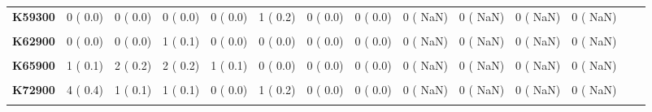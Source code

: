 \documentclass[
]{article}
\begin{document}
\begin{table}[H]
\begin{tabular}[t]{>{\raggedright\arraybackslash}p{5em}ccccccccccccc}
\textbf{K59300} & 0 (  0.0) & 0 (  0.0) & 0 (  0.0) & 0 (  0.0) & 1 (  0.2) & 0 (  0.0) & 0 (  0.0) & 0 (  NaN) & 0 (  NaN) & 0 (  NaN) & 0 (  NaN) &  & \\
\textbf{\cellcolor{gray!10}{K62500}} & \cellcolor{gray!10}{0 (  0.0)} & \cellcolor{gray!10}{1 (  0.1)} & \cellcolor{gray!10}{0 (  0.0)} & \cellcolor{gray!10}{0 (  0.0)} & \cellcolor{gray!10}{0 (  0.0)} & \cellcolor{gray!10}{0 (  0.0)} & \cellcolor{gray!10}{1 (  0.4)} & \cellcolor{gray!10}{0 (  NaN)} & \cellcolor{gray!10}{0 (  NaN)} & \cellcolor{gray!10}{0 (  NaN)} & \cellcolor{gray!10}{0 (  NaN)} & \cellcolor{gray!10}{} & \cellcolor{gray!10}{}\\
\textbf{K62900} & 0 (  0.0) & 0 (  0.0) & 1 (  0.1) & 0 (  0.0) & 0 (  0.0) & 0 (  0.0) & 0 (  0.0) & 0 (  NaN) & 0 (  NaN) & 0 (  NaN) & 0 (  NaN) &  & \\
\textbf{\cellcolor{gray!10}{K63100}} & \cellcolor{gray!10}{0 (  0.0)} & \cellcolor{gray!10}{1 (  0.1)} & \cellcolor{gray!10}{1 (  0.1)} & \cellcolor{gray!10}{3 (  0.4)} & \cellcolor{gray!10}{0 (  0.0)} & \cellcolor{gray!10}{0 (  0.0)} & \cellcolor{gray!10}{0 (  0.0)} & \cellcolor{gray!10}{0 (  NaN)} & \cellcolor{gray!10}{0 (  NaN)} & \cellcolor{gray!10}{0 (  NaN)} & \cellcolor{gray!10}{0 (  NaN)} & \cellcolor{gray!10}{} & \cellcolor{gray!10}{}\\
\textbf{K65900} & 1 (  0.1) & 2 (  0.2) & 2 (  0.2) & 1 (  0.1) & 0 (  0.0) & 0 (  0.0) & 0 (  0.0) & 0 (  NaN) & 0 (  NaN) & 0 (  NaN) & 0 (  NaN) &  & \\
\textbf{\cellcolor{gray!10}{K72000}} & \cellcolor{gray!10}{1 (  0.1)} & \cellcolor{gray!10}{0 (  0.0)} & \cellcolor{gray!10}{0 (  0.0)} & \cellcolor{gray!10}{0 (  0.0)} & \cellcolor{gray!10}{0 (  0.0)} & \cellcolor{gray!10}{0 (  0.0)} & \cellcolor{gray!10}{0 (  0.0)} & \cellcolor{gray!10}{0 (  NaN)} & \cellcolor{gray!10}{0 (  NaN)} & \cellcolor{gray!10}{0 (  NaN)} & \cellcolor{gray!10}{0 (  NaN)} & \cellcolor{gray!10}{} & \cellcolor{gray!10}{}\\
\textbf{K72900} & 4 (  0.4) & 1 (  0.1) & 1 (  0.1) & 0 (  0.0) & 1 (  0.2) & 0 (  0.0) & 0 (  0.0) & 0 (  NaN) & 0 (  NaN) & 0 (  NaN) & 0 (  NaN) &  & \\
\textbf{\cellcolor{gray!10}{K74600}} & \cellcolor{gray!10}{7 (  0.8)} & \cellcolor{gray!10}{2 (  0.2)} & \cellcolor{gray!10}{2 (  0.2)} & \cellcolor{gray!10}{2 (  0.3)} & \cellcolor{gray!10}{1 (  0.2)} & \cellcolor{gray!10}{3 (  1.1)} & \cellcolor{gray!10}{0 (  0.0)} & \cellcolor{gray!10}{0 (  NaN)} & \cellcolor{gray!10}{0 (  NaN)} & \cellcolor{gray!10}{0 (  NaN)} & \cellcolor{gray!10}{0 (  NaN)} & \cellcolor{gray!10}{} & \cellcolor{gray!10}{}\\

\end{tabular}
\end{table}
\end{document}
